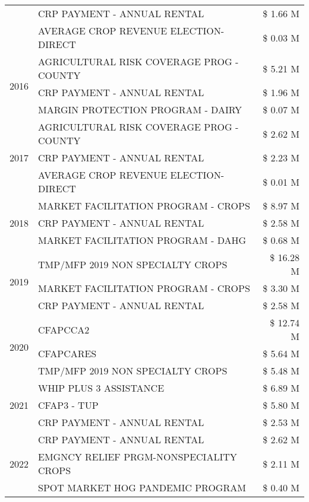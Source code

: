 \begin{tabular}{llr}
 & CRP PAYMENT - ANNUAL RENTAL & \$ 1.66 M \\
 & AVERAGE CROP REVENUE ELECTION-DIRECT & \$ 0.03 M \\
\cline{1-3}
\multirow[t]{3}{*}{2016} & AGRICULTURAL RISK COVERAGE PROG - COUNTY & \$ 5.21 M \\
 & CRP PAYMENT - ANNUAL RENTAL & \$ 1.96 M \\
 & MARGIN PROTECTION PROGRAM - DAIRY & \$ 0.07 M \\
\cline{1-3}
\multirow[t]{3}{*}{2017} & AGRICULTURAL RISK COVERAGE PROG - COUNTY & \$ 2.62 M \\
 & CRP PAYMENT - ANNUAL RENTAL & \$ 2.23 M \\
 & AVERAGE CROP REVENUE ELECTION-DIRECT & \$ 0.01 M \\
\cline{1-3}
\multirow[t]{3}{*}{2018} & MARKET FACILITATION PROGRAM - CROPS & \$ 8.97 M \\
 & CRP PAYMENT - ANNUAL RENTAL & \$ 2.58 M \\
 & MARKET FACILITATION PROGRAM - DAHG & \$ 0.68 M \\
\cline{1-3}
\multirow[t]{3}{*}{2019} & TMP/MFP 2019 NON SPECIALTY CROPS & \$ 16.28 M \\
 & MARKET FACILITATION PROGRAM - CROPS & \$ 3.30 M \\
 & CRP PAYMENT - ANNUAL RENTAL & \$ 2.58 M \\
\cline{1-3}
\multirow[t]{3}{*}{2020} & CFAPCCA2 & \$ 12.74 M \\
 & CFAPCARES & \$ 5.64 M \\
 & TMP/MFP 2019 NON SPECIALTY CROPS & \$ 5.48 M \\
\cline{1-3}
\multirow[t]{3}{*}{2021} & WHIP PLUS 3 ASSISTANCE & \$ 6.89 M \\
 & CFAP3 - TUP & \$ 5.80 M \\
 & CRP PAYMENT - ANNUAL RENTAL & \$ 2.53 M \\
\cline{1-3}
\multirow[t]{3}{*}{2022} & CRP PAYMENT - ANNUAL RENTAL & \$ 2.62 M \\
 & EMGNCY RELIEF PRGM-NONSPECIALITY CROPS & \$ 2.11 M \\
 & SPOT MARKET HOG PANDEMIC PROGRAM & \$ 0.40 M \\
\cline{1-3}
\bottomrule
\end{tabular}
